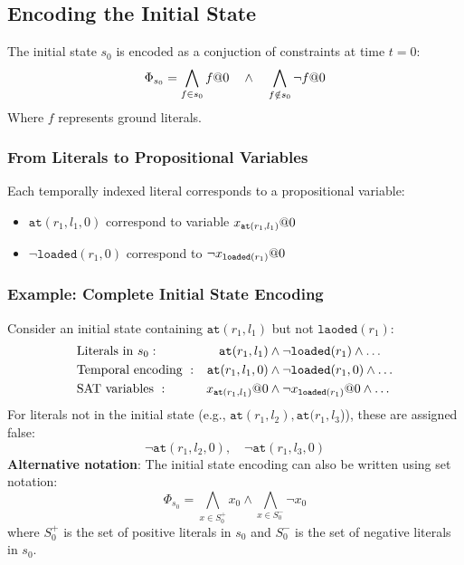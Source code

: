 \documentclass[a4paper]{article}
\theoremstyle{definition}
\begin{document}
\subsection{Encoding the Initial State}
The initial state \( s_0 \) is encoded as a conjuction of constraints at time \( t = 0 \):
\[
  \Phi_{s_0} = \bigwedge_{f \in s_0} f\symbol{64}0 \quad \wedge \quad \bigwedge_{f \notin s_0} \lnot f\symbol{64}0
\]
Where \( f \) represents ground literals.
\subsubsection{From Literals to Propositional Variables}
Each temporally indexed literal corresponds to a propositional variable:
\begin{itemize}
    \item \( \texttt{at}(r_1,l_1,0) \) correspond to variable \( x_{\texttt{at}(r_1,l_1)}\symbol{64}0 \)
    \item \( \lnot \texttt{loaded}(r_1,0) \) correspond to \( \lnot x_{\texttt{loaded}(r_1)}\symbol{64}0 \)
\end{itemize}
\subsubsection{Example: Complete Initial State Encoding}
Consider an initial state containing \( \texttt{at}(r_1,l_1) \) but not \( \texttt{laoded}(r_1) \):
\begin{align*}
    & \text{Literals in } s_0: & \texttt{at}(r_1,l_1) & \wedge \lnot \texttt{loaded}(r_1)\wedge \ldots \\
    & \text{Temporal encoding }: & \texttt{at}(r_1,l_1,0) & \wedge \lnot \texttt{loaded}(r_1,0) \wedge \ldots \\
    & \text{SAT variables }: & x_{\texttt{at}(r_1,l_1)}\symbol{64}0 & \wedge \lnot x_{\texttt{loaded}(r_1)}\symbol{64}0\wedge \ldots \\
\end{align*}
For literals not in the initial state (e.g., $\texttt{at}(r_1,l_2), \texttt{at}(r_1,l_3$)), these are assigned false:
\[
  \lnot \texttt{at}(r_1,l_2,0), \quad \lnot \texttt{at}(r_1,l_3,0)
\]
\textbf{Alternative notation}: The initial state encoding can also be written using set notation:
\[
  \Phi_{s_0} = \bigwedge_{x \in S_0^+} x_0 \wedge \bigwedge_{x \in S_0^-} \lnot x_0
\]
where \( S_0^+ \) is the set of positive literals in \( s_0 \) and \( S_0^- \) is the set of negative literals in \( s_0 \).
\end{document}
